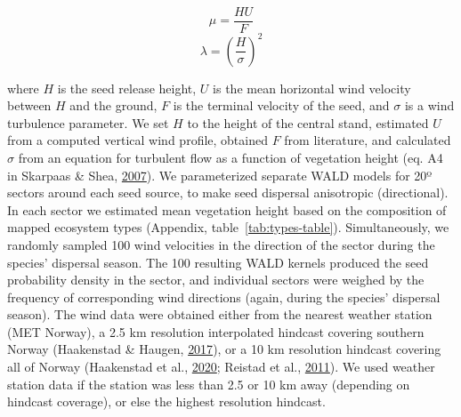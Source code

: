 \documentclass[
]{article}
\begin{document}
\begin{equation}
\mu  = \frac{HU}{F}
\end{equation}
\begin{equation}
\lambda = \left(\frac{H}{\sigma}\right)^2
\end{equation}

where \(H\) is the seed release height, \(U\) is the mean horizontal wind velocity between \(H\) and the ground, \(F\) is the terminal velocity of the seed, and \(\sigma\) is a wind turbulence parameter.
We set \(H\) to the height of the central stand, estimated \(U\) from a computed vertical wind profile, obtained \(F\) from literature, and calculated \(\sigma\) from an equation for turbulent flow as a function of vegetation height (eq. A4 in Skarpaas \& Shea, \protect\hyperlink{ref-skarpaasDispersalPatternsDispersal2007}{2007}).
We parameterized separate WALD models for 20º sectors around each seed source, to make seed dispersal anisotropic (directional).
In each sector we estimated mean vegetation height based on the composition of mapped ecosystem types (Appendix, table~\ref{tab:types-table}).
Simultaneously, we randomly sampled 100 wind velocities in the direction of the sector during the species' dispersal season.
The 100 resulting WALD kernels produced the seed probability density in the sector, and individual sectors were weighed by the frequency of corresponding wind directions (again, during the species' dispersal season).
The wind data were obtained either from the nearest weather station (MET Norway), a 2.5 km resolution interpolated hindcast covering southern Norway (Haakenstad \& Haugen, \protect\hyperlink{ref-haakenstad15yearHighResolution2017}{2017}), or a 10 km resolution hindcast covering all of Norway (Haakenstad et al., \protect\hyperlink{ref-haakenstadNORA10EIRevisedRegional2020}{2020}; Reistad et al., \protect\hyperlink{ref-reistadHighresolutionHindcastWind2011}{2011}). We used weather station data if the station was less than 2.5 or 10 km away (depending on hindcast coverage), or else the highest resolution hindcast.

\newpage
\end{document}
